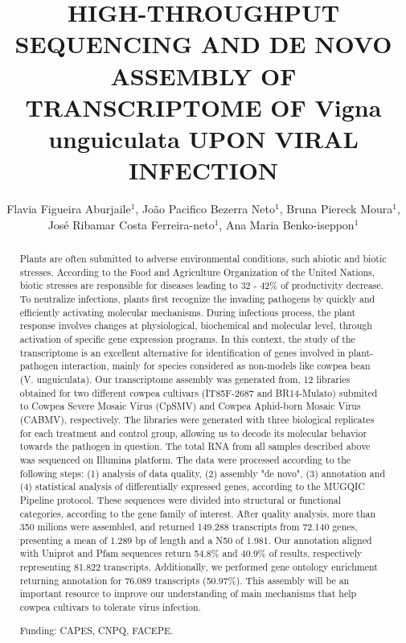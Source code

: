 \documentclass[twoside]{article}
\title{\vspace{-15mm}\fontsize{24pt}{10pt}\selectfont\textbf{HIGH-THROUGHPUT SEQUENCING AND DE NOVO ASSEMBLY OF TRANSCRIPTOME OF Vigna unguiculata UPON VIRAL INFECTION}} %
\author{Flavia Figueira Aburjaile$^1$, Jo\~ao Pacifico Bezerra Neto$^1$, Bruna Piereck Moura$^1$, Jos\'e Ribamar Costa Ferreira-neto$^1$, Ana Maria Benko-iseppon$^1$}
\affil{1 UFPE, CENTER OF BIOLOGICAL SCIENCES, GENETICS DEPT\\ }
\date{}
\begin{document}
\maketitle %

\thispagestyle{fancy} %


\begin{abstract}
Plants are often submitted to adverse environmental conditions, such abiotic and biotic stresses. According to the Food and Agriculture Organization of the United Nations, biotic stresses are responsible for diseases leading to 32 - 42\% of productivity decrease. To neutralize infections, plants first recognize the invading pathogens by quickly and efficiently activating molecular mechanisms. During  infectious process, the plant response involves changes at physiological, biochemical and molecular level, through activation of specific gene expression programs. In this context, the study of the transcriptome is an excellent alternative for identification of genes involved in plant-pathogen interaction, mainly for species considered as non-models like cowpea bean (V. unguiculata). Our transcriptome assembly was generated from, 12 libraries obtained for two different cowpea cultivars (IT85F-2687 and BR14-Mulato) submited to Cowpea Severe Mosaic Virus (CpSMV) and Cowpea Aphid-born Mosaic Virus (CABMV), respectively. The libraries were generated with three biological replicates for each treatment and control group, allowing us to decode its molecular behavior towards the pathogen in question. The total RNA from all samples described above was sequenced on Illumina platform. The data were processed according to the following steps: (1) analysis of data quality, (2) assembly "de novo", (3) annotation and (4) statistical analysis of differentially expressed genes, according to the MUGQIC Pipeline protocol. These sequences were divided into structural or functional categories, according to the gene family of interest. After quality analysis, more than 350 milions were assembled, and returned 149.288 transcripts from 72.140 genes, presenting a mean of 1.289 bp of length and a N50 of 1.981. Our annotation aligned with Uniprot and Pfam sequences return 54.8\% and 40.9\% of results, respectively representing 81.822 transcripts. Additionally, we performed gene ontology enrichment returning annotation for 76.089 transcripts (50.97\%). This assembly will be an important resource to improve our understanding of main mechanisms that help cowpea cultivars to tolerate virus infection.

Funding: CAPES, CNPQ, FACEPE.
\end{abstract}
\end{document}
